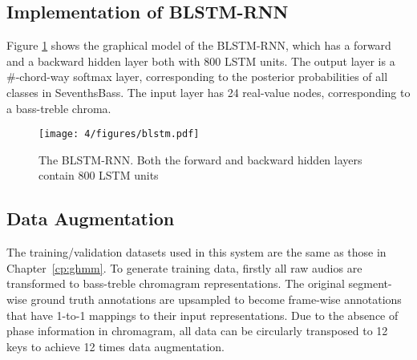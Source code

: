 \subsection{Implementation of BLSTM-RNN}
Figure \ref{fig:4-blstm} shows the graphical model of the BLSTM-RNN, which has a forward and a backward hidden layer both with 800 LSTM units. The output layer is a \#-chord-way softmax layer, corresponding to the posterior probabilities of all classes in SeventhsBass. The input layer has 24 real-value nodes, corresponding to a bass-treble chroma.

\begin{figure}[htb]
\centering
\texttt{[image: 4/figures/blstm.pdf]}
\caption{The BLSTM-RNN. Both the forward and backward hidden layers contain 800 LSTM units}
\label{fig:4-blstm}
\end{figure}

\subsection{Data Augmentation}
The training/validation datasets used in this system are the same as those in Chapter~\ref{cp:ghmm}. To generate training data, firstly all raw audios are transformed to bass-treble chromagram representations. The original segment-wise ground truth annotations are upsampled to become frame-wise annotations that have 1-to-1 mappings to their input representations. Due to the absence of phase information in chromagram, all data can be circularly transposed to 12 keys to achieve 12 times data augmentation.

